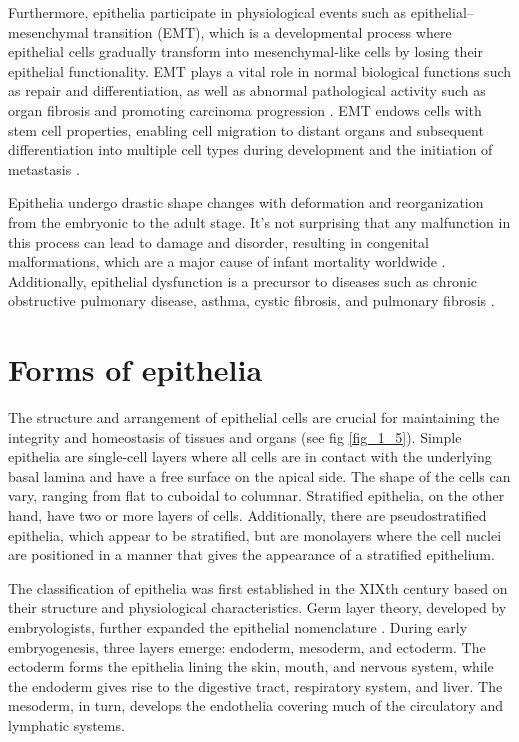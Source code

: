 Furthermore, epithelia participate in physiological events such as epithelial--mesenchymal transition (EMT), which is a developmental process where epithelial cells gradually transform into mesenchymal-like cells by losing their epithelial functionality. EMT plays a vital role in normal biological functions such as repair and differentiation, as well as abnormal pathological activity such as organ fibrosis and promoting carcinoma progression \cite{alberts2015}. EMT endows cells with stem cell properties, enabling cell migration to distant organs and subsequent differentiation into multiple cell types during development and the initiation of metastasis \cite{thiery2009}. 

Epithelia undergo drastic shape changes with deformation and reorganization from the embryonic to the adult stage. It's not surprising that any malfunction in this process can lead to damage and disorder, resulting in congenital malformations, which are a major cause of infant mortality worldwide \cite{clarke2021}. Additionally, epithelial dysfunction is a precursor to diseases such as chronic obstructive pulmonary disease, asthma, cystic fibrosis, and pulmonary fibrosis \cite{carlier2021}.

\hypertarget{forms-of-epithelia}{%
	\section{Forms of epithelia}\label{forms-of-epithelia}}

The structure and arrangement of epithelial cells are crucial for maintaining the integrity and homeostasis of tissues and organs (see fig \ref{fig_1_5}). Simple epithelia are single-cell layers where all cells are in contact with the underlying basal lamina and have a free surface on the apical side. The shape of the cells can vary, ranging from flat to cuboidal to columnar. Stratified epithelia, on the other hand, have two or more layers of cells. Additionally, there are pseudostratified epithelia, which appear to be stratified, but are monolayers where the cell nuclei are positioned in a manner that gives the appearance of a stratified epithelium.

The classification of epithelia was first established in the XIXth century based on their structure and physiological characteristics. Germ layer theory, developed by embryologists, further expanded the epithelial nomenclature \cite{maccord2012}. During early embryogenesis, three layers emerge: endoderm, mesoderm, and ectoderm. The ectoderm forms the epithelia lining the skin, mouth, and nervous system, while the endoderm gives rise to the digestive tract, respiratory system, and liver. The mesoderm, in turn, develops the endothelia covering much of the circulatory and lymphatic systems.

